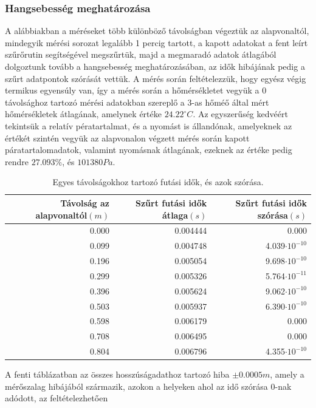 \documentclass[10pt,pdftex]{report}
\begin{document}
\subsubsection*{Hangsebesség meghatározása}
A alábbiakban a méréseket több különböző távolságban végeztük az alapvonaltól, mindegyik mérési sorozat legalább 1 percig tartott, a kapott adatokat a fent leírt 
szűrőrutin segítségével megszűrtük, majd a megmaradó adatok átlagából dolgoztunk tovább a hangsebesség meghatározásában, az idők hibájának pedig a szűrt adatpontok 
szórását vettük. A mérés során feltételezzük, hogy egyész végig termikus egyensúly van, így a mérés során a hőmérsékletet vegyük a 0 távolsághoz tartozó mérési adatokban 
szereplő a 3-as hőméő által mért hőmérsékletek átlagának, amelynek értéke $24.22^{\circ}C$. Az egyszerűség kedvéért tekintsük a relatív pératartalmat, és a nyomást 
is állandónak, amelyeknek az értékét szintén vegyük az alapvonalon végzett mérés során kapott páratartalomadatok, valamint nyomásnak átlagának, 
ezeknek az értéke pedig rendre $27.093\%$, és $101380Pa$.
\begin{table}[H]
    \begin{tabular}{|r|r|r|}
        \hline
        Távolság az alapvonaltól$(m)$ & Szűrt futási idők átlaga$(s)$ & Szűrt futási idők szórása$(s)$ \\
        \hline
        0.000 & 0.004444 & 0.000 \\
        \hline
        0.099 & 0.004748 & 4.039$\cdot 10^{-10}$ \\
        \hline
        0.196 & 0.005054 & 9.698$\cdot 10^{-10}$ \\
        \hline
        0.299 & 0.005326 & 5.764$\cdot 10^{-11}$ \\
        \hline
        0.396 & 0.005624 & 9.062$\cdot 10^{-10}$ \\
        \hline
        0.503 & 0.005937 & 6.390$\cdot 10^{-10}$ \\
        \hline
        0.598 & 0.006179 & 0.000 \\
        \hline
        0.708 & 0.006495 & 0.000 \\
        \hline
        0.804 & 0.006796 & 4.355$\cdot 10^{-10}$ \\
        \hline
    \end{tabular}
    \caption{Egyes távolságokhoz tartozó futási idők, és azok szórása.}
\end{table}
A fenti táblázatban az összes hosszúságadathoz tartozó hiba $\pm0.0005m$, amely a mérőszalag hibájából származik, azokon a helyeken ahol az idő szórása 0-nak adódott, az feltételezhetően 
\end{document}

